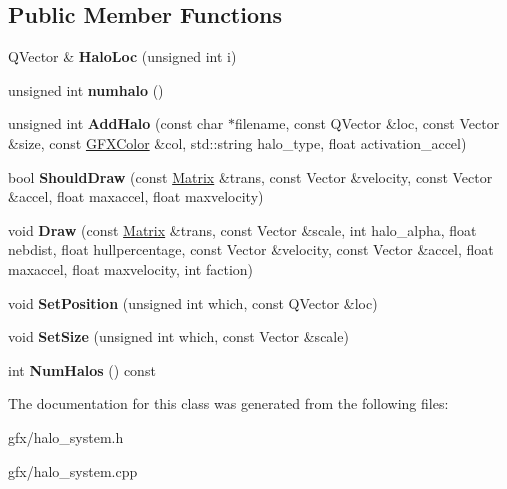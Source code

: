 \subsection*{Public Member Functions}
\begin{DoxyCompactItemize}
\item 
Q\+Vector \& {\bfseries Halo\+Loc} (unsigned int i)\hypertarget{classHaloSystem_a0f8c7e009f7da8e861ec2fd5bed900ae}{}\label{classHaloSystem_a0f8c7e009f7da8e861ec2fd5bed900ae}

\item 
unsigned int {\bfseries numhalo} ()\hypertarget{classHaloSystem_abc05bd3f7153c011868025ae32fc4a64}{}\label{classHaloSystem_abc05bd3f7153c011868025ae32fc4a64}

\item 
unsigned int {\bfseries Add\+Halo} (const char $\ast$filename, const Q\+Vector \&loc, const Vector \&size, const \hyperlink{structGFXColor}{G\+F\+X\+Color} \&col, std\+::string halo\+\_\+type, float activation\+\_\+accel)\hypertarget{classHaloSystem_ae3a2d3f4272d997067e1e14458d40fa7}{}\label{classHaloSystem_ae3a2d3f4272d997067e1e14458d40fa7}

\item 
bool {\bfseries Should\+Draw} (const \hyperlink{classMatrix}{Matrix} \&trans, const Vector \&velocity, const Vector \&accel, float maxaccel, float maxvelocity)\hypertarget{classHaloSystem_aca9267c5c4fc5c55d1157e6817ca255c}{}\label{classHaloSystem_aca9267c5c4fc5c55d1157e6817ca255c}

\item 
void {\bfseries Draw} (const \hyperlink{classMatrix}{Matrix} \&trans, const Vector \&scale, int halo\+\_\+alpha, float nebdist, float hullpercentage, const Vector \&velocity, const Vector \&accel, float maxaccel, float maxvelocity, int faction)\hypertarget{classHaloSystem_a47c093765f114711f9c7c61d543c40f2}{}\label{classHaloSystem_a47c093765f114711f9c7c61d543c40f2}

\item 
void {\bfseries Set\+Position} (unsigned int which, const Q\+Vector \&loc)\hypertarget{classHaloSystem_a2a34d25ccee75c0086bab3e5c6f9018a}{}\label{classHaloSystem_a2a34d25ccee75c0086bab3e5c6f9018a}

\item 
void {\bfseries Set\+Size} (unsigned int which, const Vector \&scale)\hypertarget{classHaloSystem_a29ae4648ddc1380865c3d73c2dfff6e1}{}\label{classHaloSystem_a29ae4648ddc1380865c3d73c2dfff6e1}

\item 
int {\bfseries Num\+Halos} () const \hypertarget{classHaloSystem_a965808dd69b1dac7b63efea2f0299775}{}\label{classHaloSystem_a965808dd69b1dac7b63efea2f0299775}

\end{DoxyCompactItemize}


The documentation for this class was generated from the following files\+:\begin{DoxyCompactItemize}
\item 
gfx/halo\+\_\+system.\+h\item 
gfx/halo\+\_\+system.\+cpp\end{DoxyCompactItemize}
